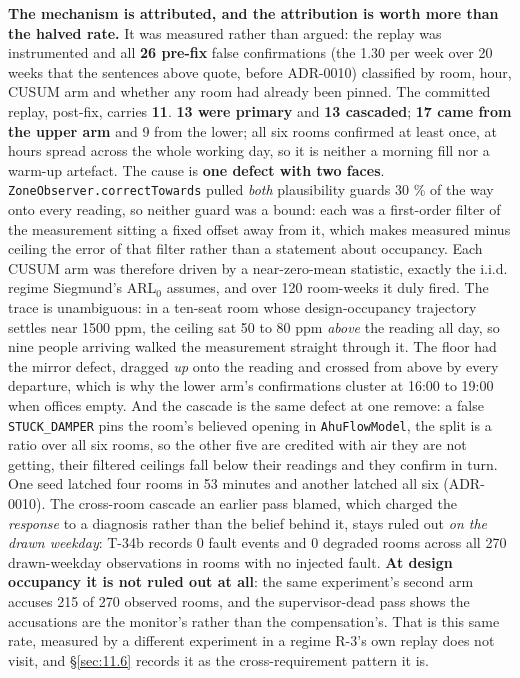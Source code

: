 \textbf{The mechanism is attributed, and the attribution is worth more than the halved rate.} It
was measured rather than argued: the replay was instrumented and all \textbf{26 pre-fix} false
confirmations (the 1.30 per week over 20 weeks that the sentences above quote, before ADR-0010)
classified by room, hour, CUSUM arm and whether any room had already been pinned. The committed
replay, post-fix, carries \textbf{11}. \textbf{13 were
primary} and \textbf{13 cascaded}; \textbf{17 came from the upper arm} and 9 from the lower; all
six rooms confirmed at least once, at hours spread across the whole working day, so it is neither a
morning fill nor a warm-up artefact. The cause is \textbf{one defect with two faces}.
\texttt{ZoneObserver.correctTowards} pulled \emph{both} plausibility guards 30 \% of the way onto
every reading, so neither guard was a bound: each was a first-order filter of the measurement
sitting a fixed offset away from it, which makes measured minus ceiling the error of that filter
rather than a statement about occupancy. Each CUSUM arm was therefore driven by a near-zero-mean
statistic, exactly the i.i.d. regime Siegmund's ARL$_0$ assumes, and over 120 room-weeks it duly
fired. The trace is unambiguous: in a ten-seat room whose design-occupancy trajectory settles near
1500 ppm, the ceiling sat 50 to 80 ppm \emph{above} the reading all day, so nine people arriving
walked the measurement straight through it. The floor had the mirror defect, dragged \emph{up} onto
the reading and crossed from above by every departure, which is why the lower arm's confirmations
cluster at 16:00 to 19:00 when offices empty. And the cascade is the same defect at one remove: a
false \texttt{STUCK\_DAMPER} pins the room's believed opening in \texttt{AhuFlowModel}, the split is
a ratio over all six rooms, so the other five are credited with air they are not getting, their
filtered ceilings fall below their readings and they confirm in turn. One seed latched four rooms
in 53 minutes and another latched all six (ADR-0010). The cross-room cascade an earlier pass
blamed, which charged the \emph{response} to a diagnosis rather than the belief behind it, stays
ruled out \emph{on the drawn weekday}: T-34b records 0 fault events and 0 degraded rooms across all
270 drawn-weekday observations in rooms with no injected fault. \textbf{At design occupancy it is
not ruled out at all}: the same experiment's second arm accuses 215 of 270 observed rooms, and
the supervisor-dead pass shows the accusations are the monitor's rather than the compensation's.
That is this same rate, measured by a different experiment in a regime R-3's own replay does not
visit, and §\ref{sec:11.6} records it as the cross-requirement pattern it is.

